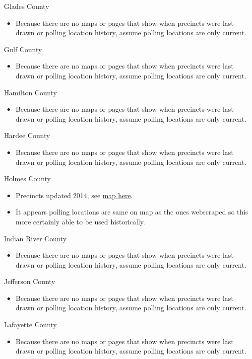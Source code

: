\documentclass[12pt]{article}
\begin{document}
Glades County
\begin{itemize}
  \item Because there are no maps or pages that show when precincts were last drawn or polling location history, assume polling locations are only current.
\end{itemize}
Gulf County
\begin{itemize}
  \item Because there are no maps or pages that show when precincts were last drawn or polling location history, assume polling locations are only current.
\end{itemize}
Hamilton County
\begin{itemize}
  \item Because there are no maps or pages that show when precincts were last drawn or polling location history, assume polling locations are only current.
\end{itemize}
Hardee County
\begin{itemize}
  \item Because there are no maps or pages that show when precincts were last drawn or polling location history, assume polling locations are only current.
\end{itemize}
Holmes County
\begin{itemize}
  \item Precincts updated 2014, see \href{https://www.holmeselections.com/Portals/Holmes/Documents/Precinct%20Map.pdf?ver=2014-02-07-162932-680}{map here}.
  \item It appears polling locations are same on map as the ones webscraped so this more certainly able to be used historically.
\end{itemize}
Indian River County
\begin{itemize}
  \item Because there are no maps or pages that show when precincts were last drawn or polling location history, assume polling locations are only current.
\end{itemize}
Jefferson County
\begin{itemize}
  \item Because there are no maps or pages that show when precincts were last drawn or polling location history, assume polling locations are only current.
\end{itemize}
Lafayette County
\begin{itemize}
  \item Because there are no maps or pages that show when precincts were last drawn or polling location history, assume polling locations are only current.
\end{itemize}
\end{document}
